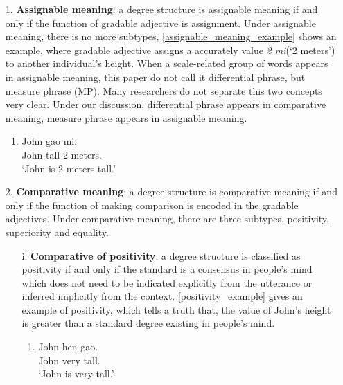 \documentclass{ctexart}
\begin{document}
\begin{itemize}

    \item[1.] \textbf{Assignable meaning}: a degree structure is assignable meaning if and only if the function of gradable adjective is assignment. Under assignable meaning, there is no more subtypes, \ref{assignable_meaning_example} shows an example, where gradable adjective assigns a accurately value \textit{2 mi}(`2 meters') to another individual's height. When a scale-related group of words appears in assignable meaning, this paper do not call it differential phrase, but measure phrase (MP). Many researchers do not separate this two concepts very clear. Under our discussion, differential phrase appears in comparative meaning, measure phrase appears in assignable meaning. 
    
    \begin{enumerate}
        \item \label{assignable_meaning_example}
        John gao  mi.\\
        John tall 2 meters. \\
        `John is 2 meters tall.'
    \end{enumerate}
    
    \item[2.] \textbf{Comparative meaning}: a degree structure is comparative meaning if and only if the function of making comparison is encoded in the gradable adjectives. Under comparative meaning, there are three subtypes, positivity, superiority and equality. 
    
    \begin{itemize}

        \item[i.] \textbf{Comparative of positivity}: a degree structure is classified as positivity if and only if the standard is a consensus in people's mind which does not need to be indicated explicitly from the utterance or inferred implicitly from the context. \ref{positivity_example} gives an example of positivity, which tells a truth that, the value of John's height is greater than a standard degree existing in people's mind. 
        
        \begin{enumerate}
            \item \label{positivity_example}
            John hen gao. \\
            John very tall. \\
            `John is very tall.'
        \end{enumerate}
        

\end{itemize}
\end{itemize}
\end{document}
